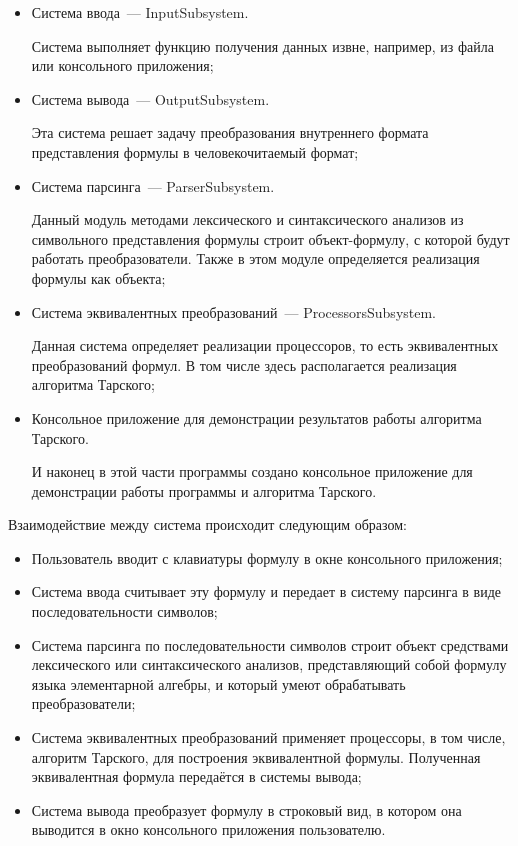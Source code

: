 \begin{itemize}
    \item Система ввода~--- InputSubsystem. 
    
    Система выполняет функцию получения данных извне, например, из файла или консольного приложения;

    \item Система вывода~--- OutputSubsystem.

    Эта система решает задачу преобразования внутреннего формата представления формулы в человекочитаемый формат;

    \item Система парсинга~--- ParserSubsystem.
    
    Данный модуль методами лексического и синтаксического анализов из символьного представления формулы строит объект-формулу, с которой будут работать преобразователи. Также в этом модуле определяется реализация формулы как объекта; 

    \item Система эквивалентных преобразований~--- ProcessorsSubsystem.
    
    Данная система определяет реализации процессоров, то есть эквивалентных преобразований формул. В том числе здесь располагается реализация алгоритма Тарского;

    \item Консольное приложение для демонстрации результатов работы алгоритма Тарского.
    
    И наконец в этой части программы создано консольное приложение для демонстрации работы программы и алгоритма Тарского.

\end{itemize}
Взаимодействие между система происходит следующим образом:
\begin{itemize}
    \item Пользователь вводит с клавиатуры формулу в окне консольного приложения;
    \item Система ввода считывает эту формулу и передает в систему парсинга в виде последовательности символов;
    \item Система парсинга по последовательности символов строит объект средствами лексического или синтаксического анализов, представляющий собой формулу языка элементарной алгебры, и который умеют обрабатывать преобразователи;
    \item Система эквивалентных преобразований применяет процессоры, в том числе, алгоритм Тарского, для построения эквивалентной формулы. Полученная эквивалентная формула передаётся в системы вывода;
    \item Система вывода преобразует формулу в строковый вид, в котором она выводится в окно консольного приложения пользователю.
\end{itemize}

